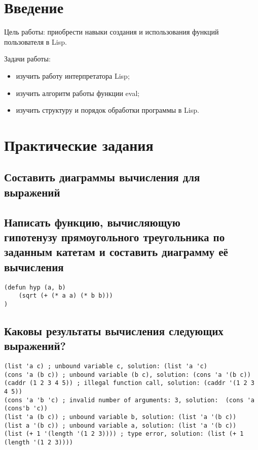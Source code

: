 \documentclass[a4paper, 14pt, unknownkeysallowed]{extreport}
\begin{document}

\setcounter{page}{2}

\chapter*{Введение}
Цель работы: приобрести навыки создания и использования функций пользователя в Lisp.

Задачи работы:
\begin{itemize}
	\item изучить работу интерпретатора Lisp;
	\item изучить алгоритм работы функции eval;
	\item изучить структуру и порядок обработки программы в Lisp.
\end{itemize}

\chapter{Практические задания}

\section{Составить диаграммы вычисления для \\выражений}


\clearpage
\section{Написать функцию, вычисляющую \\ гипотенузу прямоугольного треугольника по заданным катетам и составить диаграмму её вычисления}

\begin{lstlisting}
(defun hyp (a, b)
	(sqrt (+ (* a a) (* b b)))
)
\end{lstlisting}


\section{Каковы результаты вычисления следующих выражений?}

\begin{lstlisting}
(list 'a c) ; unbound variable c, solution: (list 'a 'c)
(cons 'a (b c)) ; unbound variable (b c), solution: (cons 'a '(b c))
(caddr (1 2 3 4 5)) ; illegal function call, solution: (caddr '(1 2 3 4 5))
(cons 'a 'b 'c) ; invalid number of arguments: 3, solution:  (cons 'a (cons'b 'c))
(list 'a (b c)) ; unbound variable b, solution: (list 'a '(b c))
(list a '(b c)) ; unbound variable a, solution: (list 'a '(b c))
(list (+ 1 '(length '(1 2 3)))) ; type error, solution: (list (+ 1 (length '(1 2 3))))
\end{lstlisting}
\end{document}
